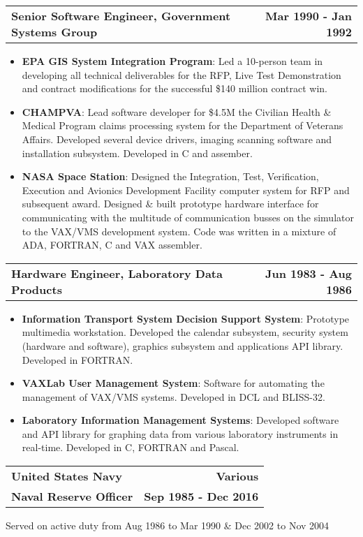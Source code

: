 \documentclass[letterpaper,10pt, sans]{article}
\makeatletter
\newcommand{\resumeCompanyHeading}[4]{
  \vspace{-1pt}
    \item
    \begin{tabular*}{1.0\textwidth}[t]{l@{\extracolsep{\fill}}r}
      \textbf{#1} & \textbf{#2} \\
      \textbf{#3} & \textbf{#4}
    \end{tabular*}\vspace{-1pt}
  }
\newcommand{\resumeCompanyPositionHeading}[2]{
    \vspace{-1pt}
      \item
      \begin{tabular*}{1.0\textwidth}{l@{\extracolsep{\fill}}r}
        \textbf{#1} & \textbf{#2}
    \end{tabular*}\vspace{-1pt}
}
\newcommand{\resumeJobDescription}[1][]{
    \vspace{-1pt}\par{#1}
}
\newcommand{\resumeItem}[2]{\item{{\textbf{#1}}: {#2 \vspace{1pt}}}}
\newcommand{\resumeItemListStart}{\begin{itemize}}\vspace{-1pt}
\newcommand{\resumeItemListEnd}{\end{itemize}}\vspace{-1pt}
\makeatother
\begin{document}
        \resumeCompanyPositionHeading
          {Senior Software Engineer, Government Systems Group}{Mar 1990 - Jan 1992}
          \resumeItemListStart
            \resumeItem{EPA GIS System Integration Program}{Led a 10-person team in developing all technical deliverables for the RFP, Live Test Demonstration and contract
              modifications for the successful \$140 million contract win.}
            \resumeItem{CHAMPVA}{Lead software developer for \$4.5M the Civilian Health \& Medical Program claims processing system for the 
              Department of Veterans Affairs.  Developed several device drivers, imaging scanning software and installation subsystem.  Developed in C and assember.}
            \resumeItem{NASA Space Station}{Designed the Integration, Test, Verification, Execution and Avionics Development Facility computer system for 
              RFP and subsequent award. Designed \& built prototype hardware interface for communicating with the multitude of communication busses on the simulator to
              the VAX/VMS development system.  Code was written in a mixture of ADA, FORTRAN, C and VAX assembler.}
          \resumeItemListEnd
    
        \resumeCompanyPositionHeading
          {Hardware Engineer, Laboratory Data Products}{Jun 1983 - Aug 1986}
            \resumeItemListStart
                \resumeItem{Information Transport System Decision Support System}{Prototype multimedia workstation. Developed the calendar subsystem,
                 security system (hardware and software), graphics subsystem and applications API library.  Developed in FORTRAN.}
                \resumeItem{VAXLab User Management System}{Software for automating the management of VAX/VMS systems.  Developed in DCL and BLISS-32.}
                \resumeItem{Laboratory Information Management Systems}{Developed software and API library for graphing data from various laboratory
                            instruments in real-time.  Developed in C, FORTRAN and Pascal.}
            \resumeItemListEnd
  
        \resumeCompanyHeading
          {United States Navy}{Various}
          {Naval Reserve Officer}{Sep 1985 - Dec 2016}
          \resumeJobDescription
            {Served on active duty from Aug 1986 to Mar 1990 \& Dec 2002 to Nov 2004}
            
\end{document}
